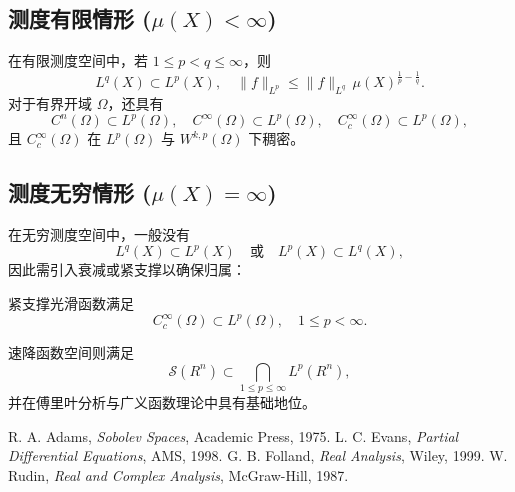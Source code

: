 \documentclass[12pt,a4paper]{article}
\newcommand{\R}{\mathbb{R}}                %
\def\R{R}%
\theoremstyle{plain}
\theoremstyle{definition}
\theoremstyle{remark}
\begin{document}
\subsection{测度有限情形 ($\mu(X)<\infty$)}

在有限测度空间中，若 $1\leq p<q\le\infty$，则
\[
L^q(X)\subset L^p(X),\quad
\|f\|_{L^p}\le\|f\|_{L^q}\,\mu(X)^{\tfrac1p-\tfrac1q}.
\]
对于有界开域 $\Omega$，还具有
\[
C^n(\Omega)\subset L^p(\Omega),\quad
C^\infty(\Omega)\subset L^p(\Omega),\quad
C_c^\infty(\Omega)\subset L^p(\Omega),
\]
且 $C_c^\infty(\Omega)$ 在 $L^p(\Omega)$ 与 $W^{k,p}(\Omega)$ 下稠密。

\subsection{测度无穷情形 ($\mu(X)=\infty$)}

在无穷测度空间中，一般没有
\[
L^q(X)\subset L^p(X)\quad\text{或}\quad L^p(X)\subset L^q(X),
\]
因此需引入衰减或紧支撑以确保归属：

紧支撑光滑函数满足
\[
C_c^\infty(\Omega)\subset L^p(\Omega),\quad 1\le p<\infty.
\]

速降函数空间则满足
\[
\mathcal S(\R^n)\subset \bigcap_{1\le p\le\infty}L^p(\R^n),
\]
并在傅里叶分析与广义函数理论中具有基础地位。

\begin{thebibliography}{9}
 R. A. Adams, \textit{Sobolev Spaces}, Academic Press, 1975.
 L. C. Evans, \textit{Partial Differential Equations}, AMS, 1998.
 G. B. Folland, \textit{Real Analysis}, Wiley, 1999.
 W. Rudin, \textit{Real and Complex Analysis}, McGraw-Hill, 1987.
\end{thebibliography}
\end{document}
